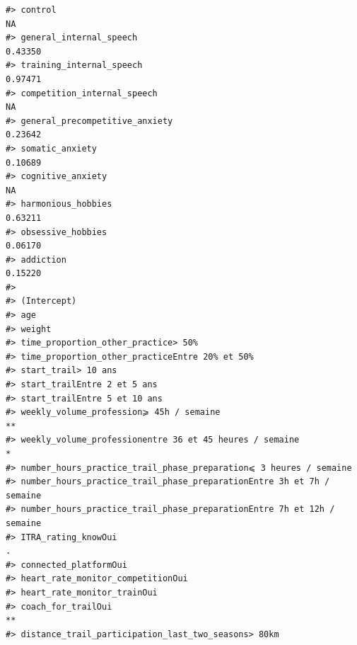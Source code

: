 \documentclass[
]{article}
\begin{document}
\begin{verbatim}
#> control                                                                              NA
#> general_internal_speech                                                         0.43350
#> training_internal_speech                                                        0.97471
#> competition_internal_speech                                                          NA
#> general_precompetitive_anxiety                                                  0.23642
#> somatic_anxiety                                                                 0.10689
#> cognitive_anxiety                                                                    NA
#> harmonious_hobbies                                                              0.63211
#> obsessive_hobbies                                                               0.06170
#> addiction                                                                       0.15220
#>                                                                                  
#> (Intercept)                                                                      
#> age                                                                              
#> weight                                                                           
#> time_proportion_other_practice> 50%                                              
#> time_proportion_other_practiceEntre 20% et 50%                                   
#> start_trail> 10 ans                                                              
#> start_trailEntre 2 et 5 ans                                                      
#> start_trailEntre 5 et 10 ans                                                     
#> weekly_volume_profession⩾ 45h / semaine                                        **
#> weekly_volume_professionentre 36 et 45 heures / semaine                        * 
#> number_hours_practice_trail_phase_preparation⩽ 3 heures / semaine                
#> number_hours_practice_trail_phase_preparationEntre 3h et 7h / semaine            
#> number_hours_practice_trail_phase_preparationEntre 7h et 12h / semaine           
#> ITRA_rating_knowOui                                                            . 
#> connected_platformOui                                                            
#> heart_rate_monitor_competitionOui                                                
#> heart_rate_monitor_trainOui                                                      
#> coach_for_trailOui                                                             **
#> distance_trail_participation_last_two_seasons> 80km                              

\end{verbatim}
\end{document}
